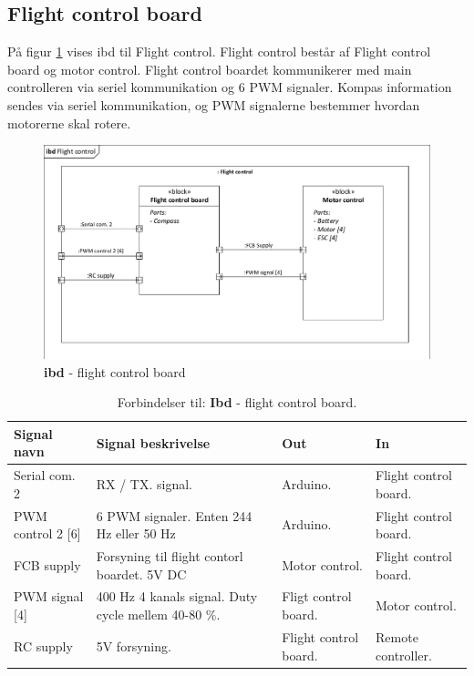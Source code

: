 \subsection{Flight control board}

På figur \ref{fig:ibd_flightcontrolboard} vises ibd til Flight control. Flight control består af Flight control board og motor control. Flight control boardet kommunikerer med main controlleren via seriel kommunikation og 6 PWM signaler. Kompas information sendes via seriel kommunikation, og PWM signalerne bestemmer hvordan motorerne skal rotere. 

\begin{figure}[H]
\centering
\includegraphics[width=1\textwidth]{Billeder/IBD/ibd5_flightcontrolboard.pdf}
\vspace{-0.5cm}
\caption{\textbf{ibd} - flight control board}
\label{fig:ibd_flightcontrolboard}
\end{figure}

\vspace{0.5cm}

\begin{table}[H]
	\centering
		\begin{tabular}{|p{3.2 cm}|p{5.2 cm}|p{2.4 cm}|p{2.4 cm}|} 
		\hline
			\textbf{Signal navn} 	& \textbf{Signal beskrivelse}		& \textbf{Out} 				& \textbf{In}     \\ \hline
			Serial com. 2 & RX / TX. signal. & Arduino. & Flight control board.			    \\ \hline
			PWM control 2 [6] & 6 PWM signaler. \newline Enten 244 Hz eller 50 Hz & Arduino. & Flight control board.				\\ \hline
			FCB supply &  Forsyning til flight contorl \newline boardet. 5V DC & Motor control. & Flight control board.	\\ \hline
			PWM signal [4] & 400 Hz 4 kanals signal. \newline Duty cycle mellem 40-80 $\%$. & Fligt control board. & Motor control.   \\ \hline 
			RC supply & 5V forsyning. & Flight control board. & Remote \newline controller.  \\ \hline 
		\end{tabular}
	\caption{Forbindelser til: \textbf{Ibd} - flight control board. }
	\label{tab:ibd_Flight_control_board}
\end{table}



